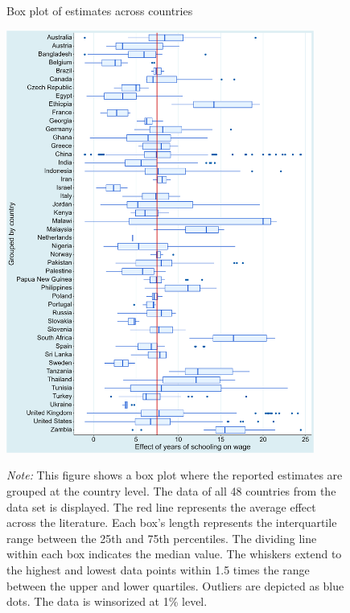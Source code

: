 \begin{figure}[!htbp]
    \begin{center}
        \caption{Box plot of estimates across countries}
        \label{fig:box_plot_countries}
        \includegraphics[width=0.9\textwidth]{Figures/box_plot_country.png}
    \end{center}\vspace{-0.7cm}
    \captionsetup{width=0.9\textwidth, font = scriptsize}
    \caption*{\emph{Note:} This figure shows a box plot where the reported estimates are grouped at the country level. The data of all 48 countries from the data set is displayed. The red line represents the average effect across the literature. Each box's length represents the interquartile range between the 25th and 75th percentiles. The dividing line within each box indicates the median value. The whiskers extend to the highest and lowest data points within 1.5 times the range between the upper and lower quartiles. Outliers are depicted as blue dots. The data is winsorized at 1\% level.}
\end{figure}
